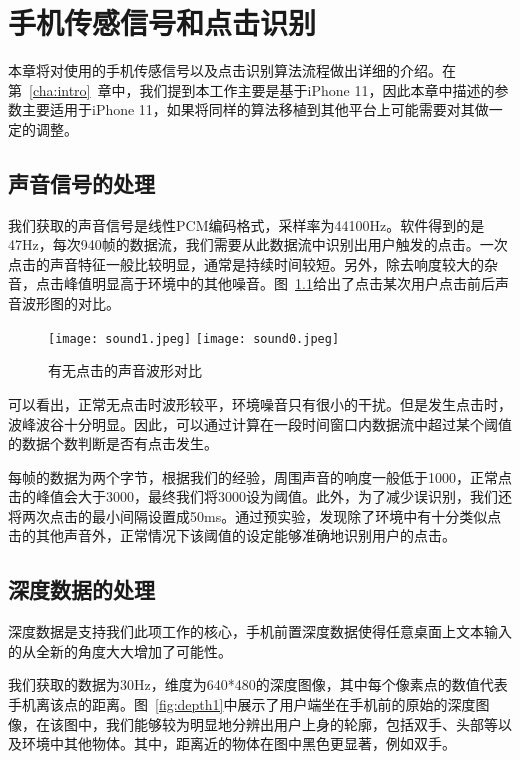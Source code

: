 \chapter{手机传感信号和点击识别}
\label{cha:sensing} %
本章将对使用的手机传感信号以及点击识别算法流程做出详细的介绍。在第~\ref{cha:intro}~章中，我们提到本工作主要是基于iPhone 11，因此本章中描述的参数主要适用于iPhone 11，如果将同样的算法移植到其他平台上可能需要对其做一定的调整。

\section{声音信号的处理}
我们获取的声音信号是线性PCM编码格式，采样率为44100Hz。软件得到的是47Hz，每次940帧的数据流，我们需要从此数据流中识别出用户触发的点击。一次点击的声音特征一般比较明显，通常是持续时间较短。另外，除去响度较大的杂音，点击峰值明显高于环境中的其他噪音。图~\ref{fig:sound-comp}给出了点击某次用户点击前后声音波形图的对比。

\begin{figure}[h]
  \centering%
    {\texttt{[image: sound1.jpeg]}}%
  \hspace{4em}%
      {\texttt{[image: sound0.jpeg]}}
  \caption{有无点击的声音波形对比}
  \label{fig:sound-comp}
\end{figure}

可以看出，正常无点击时波形较平，环境噪音只有很小的干扰。但是发生点击时，波峰波谷十分明显。因此，可以通过计算在一段时间窗口内数据流中超过某个阈值的数据个数判断是否有点击发生。

每帧的数据为两个字节，根据我们的经验，周围声音的响度一般低于1000，正常点击的峰值会大于3000，最终我们将3000设为阈值。此外，为了减少误识别，我们还将两次点击的最小间隔设置成50ms。通过预实验，发现除了环境中有十分类似点击的其他声音外，正常情况下该阈值的设定能够准确地识别用户的点击。

\section{深度数据的处理}
深度数据是支持我们此项工作的核心，手机前置深度数据使得任意桌面上文本输入的从全新的角度大大增加了可能性。

我们获取的数据为30Hz，维度为640*480的深度图像，其中每个像素点的数值代表手机离该点的距离。图~\ref{fig:depth1}中展示了用户端坐在手机前的原始的深度图像，在该图中，我们能够较为明显地分辨出用户上身的轮廓，包括双手、头部等以及环境中其他物体。其中，距离近的物体在图中黑色更显著，例如双手。

